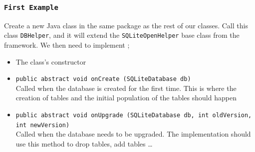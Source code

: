 \begin{frame}
\frametitle{\texttt{First Example}}
Create a new Java class in the same package as the rest of our
classes. Call this class \texttt{DBHelper}, and it will extend the \texttt{SQLiteOpenHelper} base
class from the framework. We then need to implement ;
\begin{itemize}
\item The class’s constructor
\item  \texttt{public abstract void onCreate (SQLiteDatabase db)}\\Called when the database is created for the first time. This is where the creation of tables and the initial population of the tables should happen
\item \texttt{public abstract void onUpgrade (SQLiteDatabase db, int oldVersion, int newVersion)}\\ Called when the database needs to be upgraded. The implementation should use this method to drop tables, add tables \dots
\end{itemize}

\end{frame}
